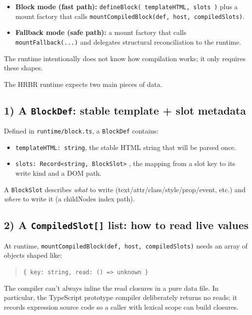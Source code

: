 \begin{itemize}
\item \textbf{Block mode (fast path):} \texttt{defineBlock({ templateHTML, slots })} plus a mount factory that calls \texttt{mountCompiledBlock(def, host, compiledSlots)}.
\item \textbf{Fallback mode (safe path):} a mount factory that calls \texttt{mountFallback(...)} and delegates structural reconciliation to the runtime.
\end{itemize}

The runtime intentionally does not know how compilation works; it only requires these shapes.

The HRBR runtime expects two main pieces of data.

\subsection{1) A \texttt{BlockDef}: stable template + slot metadata}

Defined in \texttt{runtime/block.ts}, a \texttt{BlockDef} contains:

\begin{itemize}
\item \texttt{templateHTML: string}, the stable HTML string that will be parsed once.
\item \texttt{slots: Record<string, BlockSlot>} , the mapping from a slot key to its write kind and a DOM path.
\end{itemize}

A \texttt{BlockSlot} describes \emph{what} to write (text/attr/class/style/prop/event, etc.) and \emph{where} to write it (a childNodes index path).

\subsection{2) A \texttt{CompiledSlot[]} list: how to read live values}

At runtime, \texttt{mountCompiledBlock(def, host, compiledSlots)} needs an array of objects shaped like:

\begin{quote}
\texttt{\{ key: string, read: () => unknown \}}
\end{quote}

The compiler can't always inline the read closures in a pure data file.
In particular, the TypeScript prototype compiler deliberately returns no reads; it records expression source code so a caller with lexical scope can build closures.

